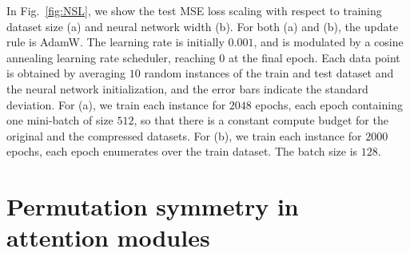 \documentclass{article}
\theoremstyle{plain}
\begin{document}
In Fig.~\ref{fig:NSL}, we show the test MSE loss scaling with respect to training dataset size (a) and neural network width (b). For both (a) and (b), the update rule is AdamW. The learning rate is initially $0.001$, and is modulated by a cosine annealing learning rate scheduler, reaching $0$ at the final epoch. Each data point is obtained by averaging $10$ random instances of the train and test dataset and the neural network initialization, and the error bars indicate the standard deviation. For (a), we train each instance for $2048$ epochs, each epoch containing one mini-batch of size $512$, so that there is a constant compute budget for the original and the compressed datasets. For (b), we train each instance for $2000$ epochs, each epoch enumerates over the train dataset. The batch size is $128$. 




\section{Permutation symmetry in attention modules}
\label{app:attention}
\end{document}
